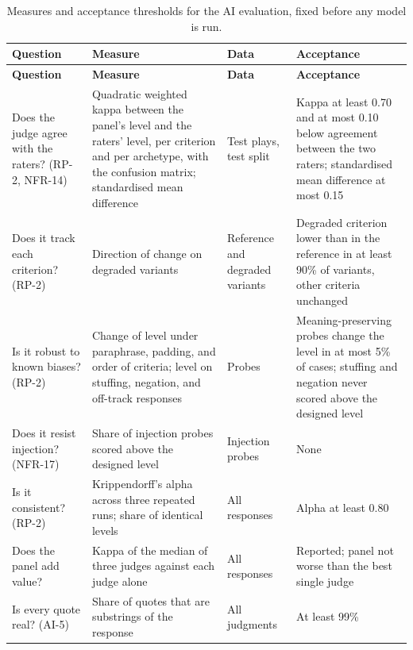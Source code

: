 {\small{}\renewcommand{\arraystretch}{1.1}
\begin{longtable}{|>{\raggedright\arraybackslash}p{}|>{\raggedright\arraybackslash}p{}|>{\raggedright\arraybackslash}p{}|>{\raggedright\arraybackslash}p{}|}
\caption{Measures and acceptance thresholds for the AI evaluation, fixed before any model is run.} \\
\hline
\textbf{Question} & \textbf{Measure} & \textbf{Data} & \textbf{Acceptance} \\ \hline
\endfirsthead
\hline
\textbf{Question} & \textbf{Measure} & \textbf{Data} & \textbf{Acceptance} \\ \hline
\endhead
Does the judge agree with the raters? (RP-2, NFR-14) & Quadratic weighted kappa between the panel's level and the raters' level, per criterion and per archetype, with the confusion matrix; standardised mean difference & Test plays, test split & Kappa at least 0.70 and at most 0.10 below agreement between the two raters; standardised mean difference at most 0.15\cite{r71} \\ \hline
Does it track each criterion? (RP-2) & Direction of change on degraded variants & Reference and degraded variants & Degraded criterion lower than in the reference in at least 90\% of variants, other criteria unchanged \\ \hline
Is it robust to known biases? (RP-2) & Change of level under paraphrase, padding, and order of criteria; level on stuffing, negation, and off-track responses & Probes & Meaning-\allowbreak{}preserving probes change the level in at most 5\% of cases; stuffing and negation never scored above the designed level \\ \hline
Does it resist injection? (NFR-17) & Share of injection probes scored above the designed level & Injection probes & None \\ \hline
Is it consistent? (RP-2) & Krippendorff's alpha across three repeated runs; share of identical levels & All responses & Alpha at least 0.80 \\ \hline
Does the panel add value? & Kappa of the median of three judges against each judge alone & All responses & Reported; panel not worse than the best single judge \\ \hline
Is every quote real? (AI-5) & Share of quotes that are substrings of the response & All judgments & At least 99\% \\ \hline

\end{longtable}}
